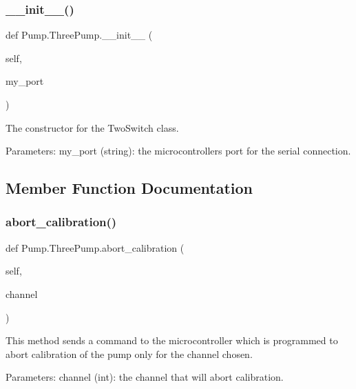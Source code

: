 \subsubsection{\texorpdfstring{\_\_init\_\_()}{\_\_init\_\_()}}
{\footnotesize\ttfamily def Pump.\+Three\+Pump.\+\_\+\+\_\+init\+\_\+\+\_\+ (\begin{DoxyParamCaption}\item[{}]{self,  }\item[{}]{my\+\_\+port }\end{DoxyParamCaption})}

\begin{DoxyVerb}The constructor for the TwoSwitch class.

Parameters:
    my_port (string): the microcontrollers port for the serial connection.
\end{DoxyVerb}
 

\subsection{Member Function Documentation}
\mbox{\label{class_pump_1_1_three_pump_a5981418cc8b62f7e47195cb676f4d5e6}} 
\subsubsection{\texorpdfstring{abort\_calibration()}{abort\_calibration()}}
{\footnotesize\ttfamily def Pump.\+Three\+Pump.\+abort\+\_\+calibration (\begin{DoxyParamCaption}\item[{}]{self,  }\item[{}]{channel }\end{DoxyParamCaption})}

\begin{DoxyVerb}This method sends a command to the microcontroller which is programmed to abort calibration of the pump only for the channel chosen.

Parameters:
    channel (int): the channel that will abort calibration.
\end{DoxyVerb}
 \mbox{\label{class_pump_1_1_three_pump_ab85be09529a117c9f2c8160814c31881}} 
